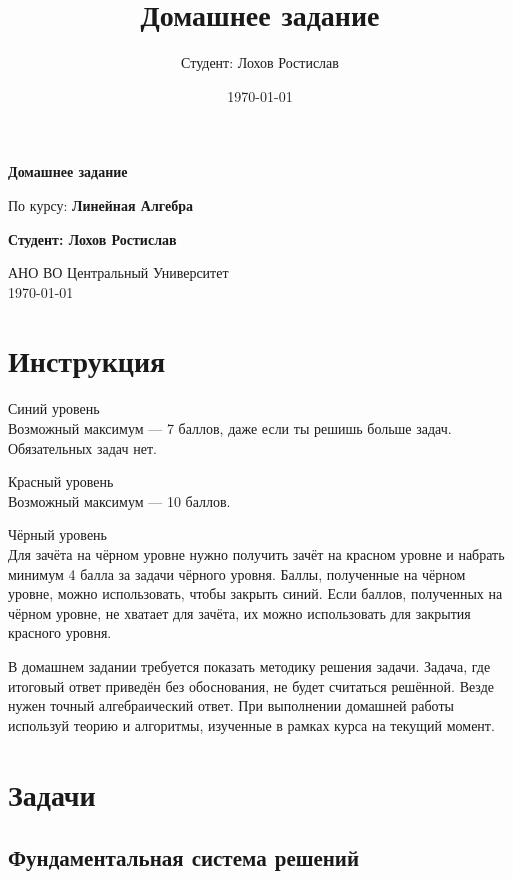 \documentclass[a4paper,12pt]{article}
\title{Домашнее задание}
\author{Студент: Лохов Ростислав}
\date{\today}
\begin{document}
\begin{titlepage}
    \centering
    \vspace*{1cm}

    \Huge
    \textbf{Домашнее задание}

    \vspace{0.5cm}
    \LARGE
    По курсу: \textbf{Линейная Алгебра}

    \vspace{1.5cm}

    \textbf{Студент: Лохов Ростислав}

    \vfill

    \Large
    АНО ВО Центральный Университет\\
    \vspace{0.3cm}
    \today

\end{titlepage}

\tableofcontents
\newpage

\section{Инструкция}

Синий уровень\\
Возможный максимум — 7 баллов, даже если ты решишь больше задач. Обязательных задач нет.

Красный уровень\\
Возможный максимум — 10 баллов.

Чёрный уровень\\
Для зачёта на чёрном уровне нужно получить зачёт на красном уровне и набрать минимум 4 балла за задачи чёрного уровня. Баллы, полученные на чёрном уровне, можно использовать, чтобы закрыть синий. Если баллов, полученных на чёрном уровне, не хватает для зачёта, их можно использовать для закрытия красного уровня.

В домашнем задании требуется показать методику решения задачи. Задача, где итоговый ответ приведён без обоснования, не будет считаться решённой. Везде нужен точный алгебраический ответ. При выполнении домашней работы используй теорию и алгоритмы, изученные в рамках курса на текущий момент.

\newpage

\section{Задачи}

\subsection{Фундаментальная система решений}
\end{document}
